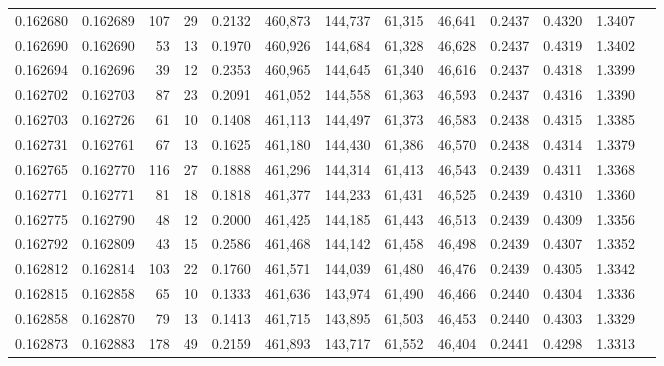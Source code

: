 \begin{tabular}{rrrrrrrrrrrrr}
0.162680 & 0.162689 &   107 &  29 &                                     0.2132 & 460,873 & 144,737 &  61,315 &  46,641 & 0.2437 & 0.4320 & 1.3407 \\
0.162690 & 0.162690 &    53 &  13 &                                     0.1970 & 460,926 & 144,684 &  61,328 &  46,628 & 0.2437 & 0.4319 & 1.3402 \\
0.162694 & 0.162696 &    39 &  12 &                                     0.2353 & 460,965 & 144,645 &  61,340 &  46,616 & 0.2437 & 0.4318 & 1.3399 \\
0.162702 & 0.162703 &    87 &  23 &                                     0.2091 & 461,052 & 144,558 &  61,363 &  46,593 & 0.2437 & 0.4316 & 1.3390 \\
0.162703 & 0.162726 &    61 &  10 &                                     0.1408 & 461,113 & 144,497 &  61,373 &  46,583 & 0.2438 & 0.4315 & 1.3385 \\
0.162731 & 0.162761 &    67 &  13 &                                     0.1625 & 461,180 & 144,430 &  61,386 &  46,570 & 0.2438 & 0.4314 & 1.3379 \\
0.162765 & 0.162770 &   116 &  27 &                                     0.1888 & 461,296 & 144,314 &  61,413 &  46,543 & 0.2439 & 0.4311 & 1.3368 \\
0.162771 & 0.162771 &    81 &  18 &                                     0.1818 & 461,377 & 144,233 &  61,431 &  46,525 & 0.2439 & 0.4310 & 1.3360 \\
0.162775 & 0.162790 &    48 &  12 &                                     0.2000 & 461,425 & 144,185 &  61,443 &  46,513 & 0.2439 & 0.4309 & 1.3356 \\
0.162792 & 0.162809 &    43 &  15 &                                     0.2586 & 461,468 & 144,142 &  61,458 &  46,498 & 0.2439 & 0.4307 & 1.3352 \\
0.162812 & 0.162814 &   103 &  22 &                                     0.1760 & 461,571 & 144,039 &  61,480 &  46,476 & 0.2439 & 0.4305 & 1.3342 \\
0.162815 & 0.162858 &    65 &  10 &                                     0.1333 & 461,636 & 143,974 &  61,490 &  46,466 & 0.2440 & 0.4304 & 1.3336 \\
0.162858 & 0.162870 &    79 &  13 &                                     0.1413 & 461,715 & 143,895 &  61,503 &  46,453 & 0.2440 & 0.4303 & 1.3329 \\
0.162873 & 0.162883 &   178 &  49 &                                     0.2159 & 461,893 & 143,717 &  61,552 &  46,404 & 0.2441 & 0.4298 & 1.3313 \\

\end{tabular}

